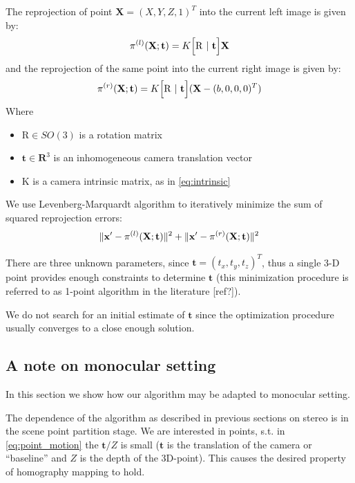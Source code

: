 \documentclass[runningheads]{llncs}
\DeclarePairedDelimiter{\norm}{\lVert}{\rVert}
\begin{document}
The reprojection of point $\mathbf{X}=(X,Y,Z,1)^T$ into the current
left image is given by:
\begin{equation}
  \pi^{(l)}(\mathbf{X};\mathbf{t}) =  K\Bigl[ \mathrm{R}\ |\ \mathbf{t} \Bigr]\mathbf{X} 
\end{equation}
and the reprojection of the same point into the current right image is
given by:
\begin{equation}
  \pi^{(r)}(\mathbf{X};\mathbf{t}) =  K\Bigl[ \mathrm{R}\ |\ \mathbf{t} \Bigr](\mathbf{X} - (b,0,0,0)^T)
\end{equation}
Where 
\begin{itemize}
\item $\mathrm{R}\in SO(3)$ is a rotation matrix
\item $\mathbf{t}\in \mathbf{R}^3$ is an inhomogeneous camera translation vector
\item $\mathrm{K}$ is a camera intrinsic matrix, as in \ref{eq:intrinsic}
\end{itemize}

We use Levenberg-Marquardt algorithm to iteratively minimize the sum
of squared reprojection errors:
\begin{equation}
\norm{\mathbf{x'} - \pi^{(l)}(\mathbf{X};\mathbf{t})}^2 + \norm{\mathbf{x'} - \pi^{(r)}(\mathbf{X};\mathbf{t})}^2
\end{equation}

There are three unknown parameters, since $\mathbf{t} =
(t_x,t_y,t_z)^T$, thus a single 3-D point provides enough constraints
to determine $\mathbf{t}$ (this minimization procedure is referred to
as 1-point algorithm in the literature [ref?]).

We do not search for an initial estimate of $\mathbf{t}$ since the
optimization procedure usually converges to a close enough solution.

\subsection{A note on monocular setting}

In this section we show how our algorithm may be adapted to monocular
setting.

The dependence of the algorithm as described in previous sections on
stereo is in the scene point partition stage.  We are interested in
points, s.t. in \ref{eq:point_motion} the $\mathbf{t}/Z$ is small
($\mathbf{t}$ is the translation of the camera or ``baseline'' and $Z$
is the depth of the 3D-point). This causes the desired property of
homography mapping to hold.
\end{document}

